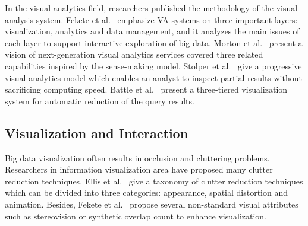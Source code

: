 \documentclass[journal]{vgtc}                %
\begin{document}
{In the visual analytics field, researchers published the methodology of the visual analysis system. Fekete et al.~\cite{Fekete2013} emphasize VA systems  on three important layers: visualization, analytics and data management, and it analyzes the main issues of each layer to support interactive exploration of big data. Morton et al.~\cite{morton2014support} present a vision of next-generation visual analytics services covered three related capabilities inspired by the sense-making model. Stolper et al.~\cite{Stolper2014} give a progressive visual analytics model which enables an analyst to inspect partial results without sacrificing computing speed. Battle et al.~\cite{battle2013dynamic} present a three-tiered visualization system for automatic reduction of the query results.
 


\subsection{Visualization and Interaction}
Big data visualization often results in occlusion and cluttering problems.  Researchers in information visualization area have proposed many clutter reduction techniques. Ellis et al.~\cite{Ellis2007} give a taxonomy of clutter reduction techniques which can be divided into three categories: appearance, spatial distortion and animation.  Besides, Fekete et al.~\cite{Fekete:2002} propose several non-standard visual attributes such as stereovision or synthetic overlap count to enhance visualization. 




}
\end{document}
